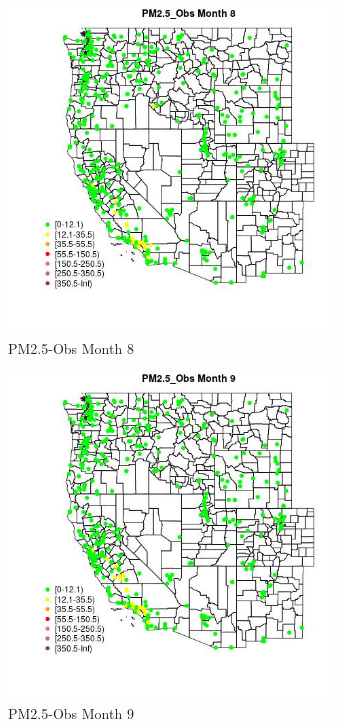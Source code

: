 \begin{figure} 
\centering  
\includegraphics[width=0.77\textwidth]{Code_Outputs/ML_input_report_ML_input_PM25_Step5_part_d_de_duplicated_aves_ML_input_MapObsMo8PM25_Obs.jpg} 
\caption{\label{fig:ML_input_report_ML_input_PM25_Step5_part_d_de_duplicated_aves_ML_inputMapObsMo8PM25_Obs}PM2.5-Obs Month 8} 
\end{figure} 
 

\begin{figure} 
\centering  
\includegraphics[width=0.77\textwidth]{Code_Outputs/ML_input_report_ML_input_PM25_Step5_part_d_de_duplicated_aves_ML_input_MapObsMo9PM25_Obs.jpg} 
\caption{\label{fig:ML_input_report_ML_input_PM25_Step5_part_d_de_duplicated_aves_ML_inputMapObsMo9PM25_Obs}PM2.5-Obs Month 9} 
\end{figure} 
 

